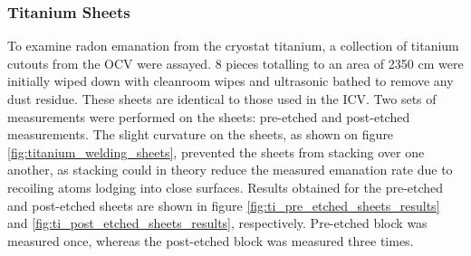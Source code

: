 \subsubsection{Titanium Sheets}

To examine radon emanation from the cryostat titanium, a collection of titanium cutouts from the OCV were assayed. 8 pieces totalling to an area of 2350 cm\squared{} were initially wiped down with cleanroom wipes and ultrasonic bathed to remove any dust residue. These sheets are identical to those used in the ICV. Two sets of measurements were performed on the sheets: pre-etched and post-etched measurements. The slight curvature on the sheets, as shown on figure \ref{fig:titanium_welding_sheets}, prevented the sheets from stacking over one another, as stacking could in theory reduce the measured emanation rate due to recoiling atoms lodging into close surfaces. Results obtained for the pre-etched and post-etched sheets are shown in figure \ref{fig:ti_pre_etched_sheets_results} and \ref{fig:ti_post_etched_sheets_results}, respectively. Pre-etched block was measured once, whereas the post-etched block was measured three times.
%
